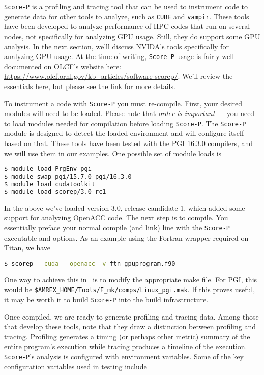 {\tt Score-P} is a profiling and tracing tool that can be used to instrument
code to generate data for other tools to analyze, such as {\tt CUBE} and 
{\tt vampir}.  These tools have been developed to analyze performance of HPC
codes that run on several nodes, not specifically for analyzing GPU usage.
Still, they do support some GPU analysis.  In the next section, we'll discuss
NVIDA's tools specifically for analyzing GPU usage.
At the time of writing, {\tt Score-P} usage is fairly well documented on OLCF's
website here: \url{https://www.olcf.ornl.gov/kb_articles/software-scorep/}.
We'll review the essentials here, but please see the link for more details.

To instrument a code with {\tt Score-P} you must re-compile.  First, your
desired modules will need to be loaded.  Please note that \emph{order is
important} --- you need to load modules needed for compilation before loading 
{\tt Score-P}.  The {\tt Score-P} module is designed to detect the loaded
environment and will configure itself based on that.  These tools have been
tested with the PGI 16.3.0 compilers, and we will use them in our examples.
One possible set of module loads is

\begin{lstlisting}[language=bash,mathescape=false]
$ module load PrgEnv-pgi
$ module swap pgi/15.7.0 pgi/16.3.0
$ module load cudatoolkit
$ module load scorep/3.0-rc1
\end{lstlisting}

In the above we've loaded version 3.0, release candidate 1, which added some
support for analyzing OpenACC code.  The next step is to compile.  You
essentially preface your normal compile (and link) line with the {\tt Score-P}
executable and options.  As an example using the Fortran wrapper required on
Titan, we have

\begin{lstlisting}[language=bash,mathescape=false]
$ scorep --cuda --openacc -v ftn gpuprogram.f90
\end{lstlisting}

One way to achieve this in \maestro\ is to modify the appropriate make file.  For
PGI, this would be {\tt \$AMREX\_HOME/Tools/F\_mk/comps/Linux\_pgi.mak}.  If
this proves useful, it may be worth it to build {\tt Score-P} into the build
infrastructure.

Once compiled, we are ready to generate profiling and tracing data.  Among those
that develop these tools, note that they draw a distinction between profiling
and tracing.  Profiling generates a timing (or perhaps other metric) summary of
the entire program's execution while tracing produces a timeline of the
execution. {\tt Score-P}'s analysis is configured with environment variables.
Some of the key configuration variables used in testing include

